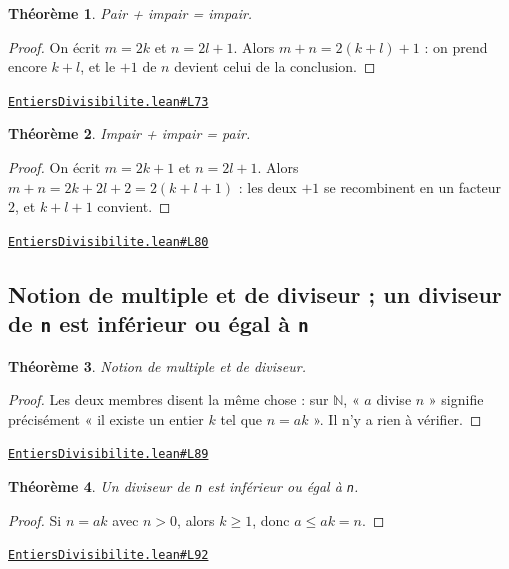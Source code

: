 \documentclass[11pt,a4paper]{article}
\theoremstyle{definition}
\theoremstyle{plain}
\newtheorem{theoreme}{Théorème}
\newcommand{\source}[2]{\par\smallskip\noindent\hfill{\footnotesize\href{#1}{\texttt{#2}}}\par\smallskip}
\begin{document}
\begin{theoreme}
Pair + impair = impair.
\end{theoreme}

\begin{proof}
On écrit $m = 2k$ et $n = 2l + 1$. Alors $m + n = 2(k+l) + 1$ : on prend encore
$k + l$, et le $+1$ de $n$ devient celui de la conclusion.
\end{proof}
\source{https://github.com/Commutator-IO/learn-lean/blob/main/courses/01-college/01-nombres-et-calculs/EntiersDivisibilite.lean\#L73}{EntiersDivisibilite.lean\#L73}

\begin{theoreme}
Impair + impair = pair.
\end{theoreme}

\begin{proof}
On écrit $m = 2k + 1$ et $n = 2l + 1$. Alors $m + n = 2k + 2l + 2 = 2(k + l + 1)$ : les
deux $+1$ se recombinent en un facteur $2$, et $k + l + 1$ convient.
\end{proof}
\source{https://github.com/Commutator-IO/learn-lean/blob/main/courses/01-college/01-nombres-et-calculs/EntiersDivisibilite.lean\#L80}{EntiersDivisibilite.lean\#L80}

\subsection{Notion de multiple et de diviseur ; un diviseur de \texttt{n} est inférieur ou égal à \texttt{n}}

\begin{theoreme}
Notion de multiple et de diviseur.
\end{theoreme}

\begin{proof}
Les deux membres disent la même chose : sur $\mathbb{N}$, « $a$ divise $n$ » signifie
précisément « il existe un entier $k$ tel que $n = ak$ ». Il n'y a rien à vérifier.
\end{proof}
\source{https://github.com/Commutator-IO/learn-lean/blob/main/courses/01-college/01-nombres-et-calculs/EntiersDivisibilite.lean\#L89}{EntiersDivisibilite.lean\#L89}

\begin{theoreme}
Un diviseur de \texttt{n} est inférieur ou égal à \texttt{n}.
\end{theoreme}

\begin{proof}
Si $n = ak$ avec $n > 0$,
alors $k \ge 1$, donc $a \le ak = n$.
\end{proof}
\source{https://github.com/Commutator-IO/learn-lean/blob/main/courses/01-college/01-nombres-et-calculs/EntiersDivisibilite.lean\#L92}{EntiersDivisibilite.lean\#L92}
\end{document}
